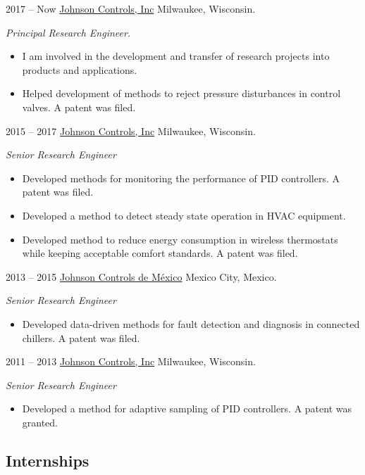 \documentclass[]{../friggeri-cv} %
\begin{document}
\begin{entrylist}


\entry
{2017 -- Now}
{\href{http://www.johnsoncontrols.com}{Johnson Controls, Inc}}
{Milwaukee, Wisconsin.}
{
\emph{Principal Research Engineer.}
\begin{itemize}
	\item I am involved in the development and transfer of research projects into products and applications.
   \item Helped development of methods to reject pressure disturbances in control valves. A patent was filed.
\end{itemize}
}
\entry
{2015 -- 2017}
{\href{http://www.johnsoncontrols.com}{Johnson Controls, Inc}}
{Milwaukee, Wisconsin.}
{
\emph{Senior Research Engineer}
\begin{itemize}
\item Developed methods for monitoring the performance of PID controllers. A patent was filed.
\item Developed a method to detect steady state operation in HVAC equipment.
\item Developed method to reduce energy consumption in wireless thermostats while keeping acceptable comfort standards. A patent was filed.
\end{itemize}
}

\entry
{2013 -- 2015}
{\href{http://www.johnsoncontrols.com/es_mx}{Johnson Controls de México}}
{Mexico City, Mexico.}
{
\emph{Senior Research Engineer}
\begin{itemize}
\item Developed data-driven methods for fault detection and diagnosis in connected chillers. A patent was filed.
\end{itemize}
}

\entry
{2011 -- 2013}
{\href{http://www.johnsoncontrols.com}{Johnson Controls, Inc}}
{Milwaukee, Wisconsin.}
{
\emph{Senior Research Engineer}
\begin{itemize}
\item Developed a method for adaptive sampling of PID controllers. A patent was granted.
\end{itemize}
}

\end{entrylist}

\pagebreak

\subsection{Internships}
\end{document}
